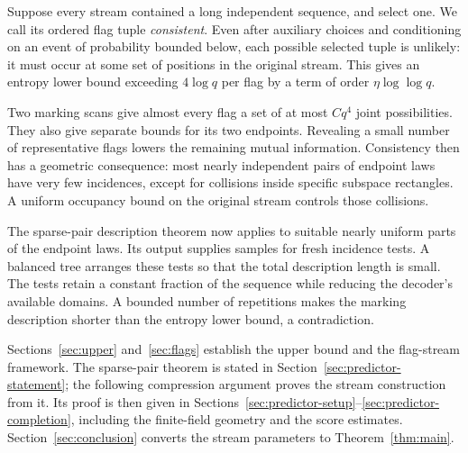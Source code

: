 Suppose every stream contained a long independent sequence, and
select one. We call its ordered flag tuple \emph{consistent}.
Even after auxiliary choices and conditioning on an event of
probability bounded below, each possible selected tuple is unlikely:
it must occur at some set of positions in the original stream.
This gives an entropy lower bound exceeding \(4\log q\) per flag
by a term of order \(\eta\log\log q\).

Two marking scans give almost every flag a set of at most \(Cq^4\)
joint possibilities. They also give separate bounds for its two
endpoints. Revealing a small number of representative flags lowers
the remaining mutual information. Consistency then has a geometric
consequence: most nearly independent pairs of endpoint laws have
very few incidences, except for collisions inside specific subspace
rectangles. A uniform occupancy bound on the original stream controls
those collisions.

The sparse-pair description theorem now applies to suitable nearly
uniform parts of the endpoint laws. Its output supplies samples
for fresh incidence tests. A balanced tree arranges these tests so
that the total description length is small. The tests retain a
constant fraction of the sequence while reducing the decoder's
available domains. A bounded number of repetitions makes the
marking description shorter than the entropy lower bound, a
contradiction.

Sections~\ref{sec:upper} and~\ref{sec:flags} establish the upper bound
and the flag-stream framework. The sparse-pair theorem is stated
in Section~\ref{sec:predictor-statement}; the following compression
argument proves the stream construction from it. Its proof is
then given in Sections~\ref{sec:predictor-setup}--\ref{sec:predictor-completion},
including the finite-field geometry and the score estimates.
Section~\ref{sec:conclusion} converts the stream parameters to
Theorem~\ref{thm:main}.
